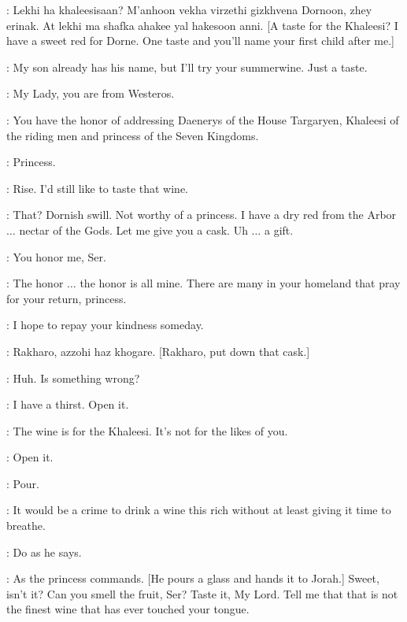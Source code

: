 \WINESELLER:  Lekhi ha khaleesisaan? M'anhoon vekha virzethi gizkhvena Dornoon, zhey erinak. At lekhi ma shafka ahakee yal hakesoon anni. [A taste for the Khaleesi?  I have a sweet red for Dorne.  One taste and you'll name your first child after me.] 

\DAENERYS: My son already has his name, but I'll try your summerwine.  Just a taste. 

\WINESELLER: My Lady, you are from Westeros. 

\IRRI: You have the honor of addressing Daenerys of the House Targaryen, Khaleesi of the riding men and princess of the Seven Kingdoms. 

\WINESELLER:  Princess. 

\DAENERYS: Rise.  I'd still like to taste that wine.  

\WINESELLER: That? Dornish swill.  Not worthy of a princess.  I have a dry red from the Arbor $\ldots$ nectar of the Gods.  Let me give you a cask. Uh $\ldots$ a gift. 

\DAENERYS: You honor me, Ser. 

\WINESELLER: The honor $\ldots$ the honor is all mine. There are many in your homeland that pray for your return, princess. 


\DAENERYS: I hope to repay your kindness someday. 


\JORAH: Rakharo, azzohi haz khogare. [Rakharo, put down that cask.] 

\DAENERYS: Huh. Is something wrong? 

\JORAH: I have a thirst.  Open it. 

\WINESELLER: The wine is for the Khaleesi. It's not for the likes of you. 

\JORAH: Open it. 


\JORAH: Pour. 

\WINESELLER: It would be a crime to drink a wine this rich without at least giving it time to breathe. 

\DAENERYS: Do as he says. 

\WINESELLER: As the princess commands. [He pours a glass and hands it to Jorah.] Sweet, isn't it?  Can you smell the fruit, Ser?  Taste it, My Lord.  Tell me that that is not the finest wine that has ever touched your tongue. 

